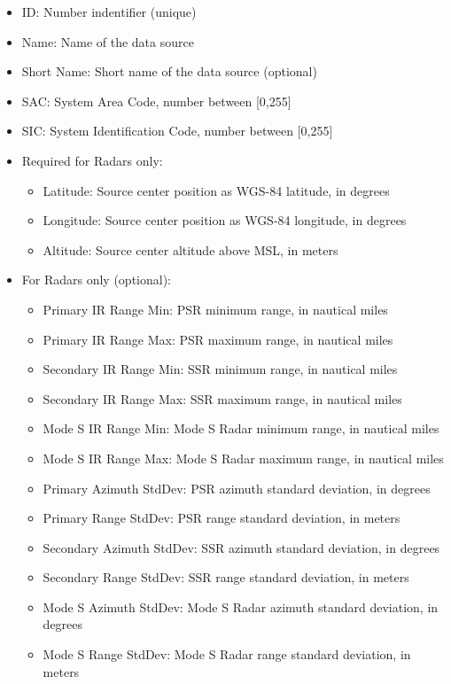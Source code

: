 \begin{itemize}  
\item ID: Number indentifier (unique)
\item Name: Name of the data source
\item Short Name: Short name of the data source (optional)
\item SAC: System Area Code, number between [0,255]
\item SIC: System Identification Code, number between [0,255]
\item Required for Radars only:
\begin{itemize}  
\item Latitude: Source center position as WGS-84 latitude, in degrees
\item Longitude: Source center position as WGS-84 longitude, in degrees
\item Altitude: Source center altitude above MSL, in meters
\end{itemize}
\item For Radars only (optional):
\begin{itemize}  
\item Primary IR Range Min: PSR minimum range, in nautical miles
\item Primary IR Range Max: PSR maximum range, in nautical miles
\item Secondary IR Range Min: SSR minimum range, in nautical miles
\item Secondary IR Range Max: SSR maximum range, in nautical miles
\item Mode S IR Range Min: Mode S Radar minimum range, in nautical miles
\item Mode S IR Range Max: Mode S Radar maximum range, in nautical miles
\item Primary Azimuth StdDev: PSR azimuth standard deviation, in degrees
\item Primary Range StdDev: PSR range standard deviation, in meters
\item Secondary Azimuth StdDev: SSR azimuth standard deviation, in degrees
\item Secondary Range StdDev: SSR range standard deviation, in meters
\item Mode S Azimuth StdDev: Mode S Radar azimuth standard deviation, in degrees
\item Mode S Range StdDev: Mode S Radar range standard deviation, in meters
\end{itemize}
\end{itemize}
\ \\

